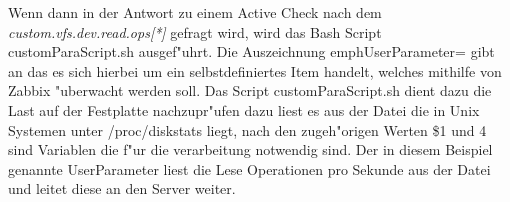 Wenn dann in der Antwort zu einem Active Check nach dem \emph{custom.vfs.dev.read.ops[*]} gefragt wird, wird das Bash Script customParaScript.sh %
ausgef"uhrt. Die Auszeichnung emph{UserParameter=} gibt an das es sich hierbei um ein selbstdefiniertes Item handelt, welches mithilfe von Zabbix %
"uberwacht werden soll. Das Script customParaScript.sh dient dazu die Last auf der Festplatte nachzupr"ufen %
dazu liest es aus der Datei die in Unix Systemen unter /proc/diskstats liegt, nach den zugeh"origen Werten \$1 und 4 sind Variablen die f"ur die %
verarbeitung notwendig sind. Der in diesem Beispiel genannte UserParameter liest die Lese Operationen pro Sekunde aus der Datei und leitet diese %
an den Server weiter.

